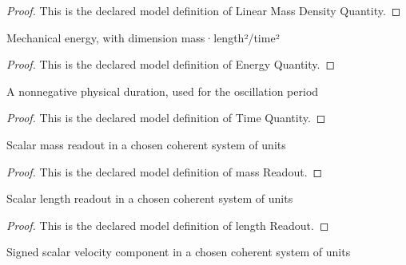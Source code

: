 \begin{proof}
  This is the declared model definition of Linear Mass Density Quantity.
\end{proof}
\begin{definition}
  \label{def:physics:phyx-mini-0237:phyxminiproblems-problemphyxmini0237-energyquantity}
  Mechanical energy, with dimension mass·length²/time²
\end{definition}
\begin{proof}
  This is the declared model definition of Energy Quantity.
\end{proof}
\begin{definition}
  \label{def:physics:phyx-mini-0237:phyxminiproblems-problemphyxmini0237-timequantity}
  A nonnegative physical duration, used for the oscillation period
\end{definition}
\begin{proof}
  This is the declared model definition of Time Quantity.
\end{proof}
\begin{definition}
  \label{def:physics:phyx-mini-0237:phyxminiproblems-problemphyxmini0237-massreadout}
  Scalar mass readout in a chosen coherent system of units
\end{definition}
\begin{proof}
  This is the declared model definition of mass Readout.
\end{proof}
\begin{definition}
  \label{def:physics:phyx-mini-0237:phyxminiproblems-problemphyxmini0237-lengthreadout}
  Scalar length readout in a chosen coherent system of units
\end{definition}
\begin{proof}
  This is the declared model definition of length Readout.
\end{proof}
\begin{definition}
  \label{def:physics:phyx-mini-0237:phyxminiproblems-problemphyxmini0237-velocityreadout}
  Signed scalar velocity component in a chosen coherent system of units
\end{definition}

